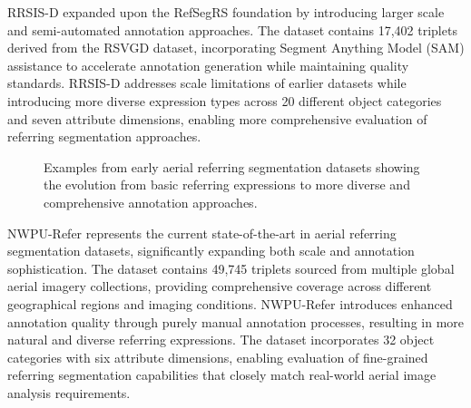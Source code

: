 RRSIS-D expanded upon the RefSegRS foundation by introducing larger scale and semi-automated annotation approaches. The dataset contains 17,402 triplets derived from the RSVGD dataset, incorporating Segment Anything Model (SAM) assistance to accelerate annotation generation while maintaining quality standards. RRSIS-D addresses scale limitations of earlier datasets while introducing more diverse expression types across 20 different object categories and seven attribute dimensions, enabling more comprehensive evaluation of referring segmentation approaches.

\begin{figure}[htbp]
\centering
{}
\hfill
{}
\caption{Examples from early aerial referring segmentation datasets showing the evolution from basic referring expressions to more diverse and comprehensive annotation approaches.}
\label{fig:aerial_datasets}
\end{figure}

NWPU-Refer represents the current state-of-the-art in aerial referring segmentation datasets, significantly expanding both scale and annotation sophistication. The dataset contains 49,745 triplets sourced from multiple global aerial imagery collections, providing comprehensive coverage across different geographical regions and imaging conditions. NWPU-Refer introduces enhanced annotation quality through purely manual annotation processes, resulting in more natural and diverse referring expressions. The dataset incorporates 32 object categories with six attribute dimensions, enabling evaluation of fine-grained referring segmentation capabilities that closely match real-world aerial image analysis requirements.


